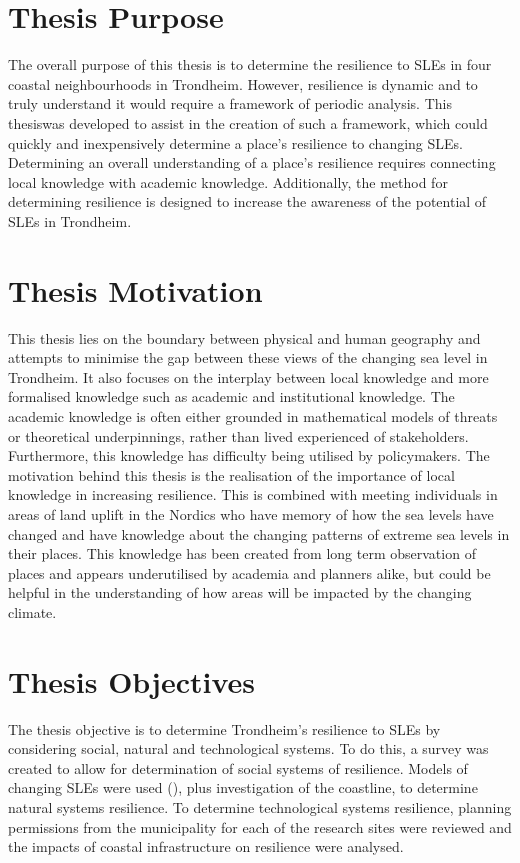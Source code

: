 \paragraph{}

\section{Thesis Purpose}
The overall purpose of this thesis is to determine the resilience to SLEs in four coastal neighbourhoods in Trondheim. However, resilience is dynamic and to truly understand it would require a framework of periodic analysis. This thesiswas developed to assist in the creation of such a framework, which could quickly and inexpensively determine a place's resilience to changing SLEs. Determining an overall understanding of a place's resilience requires connecting local knowledge with academic knowledge. Additionally, the method for determining resilience is designed to increase the awareness of the potential of SLEs in Trondheim. 

\section{Thesis Motivation}
 This thesis lies on the boundary between physical and human geography and attempts to minimise the gap between these views of the changing sea level in Trondheim. It also focuses on the interplay between local knowledge and more formalised knowledge such as academic and institutional knowledge. The academic knowledge is often either grounded in mathematical models of threats or theoretical underpinnings, rather than lived experienced of stakeholders. Furthermore, this knowledge has difficulty being utilised by policymakers. The motivation behind this thesis is the realisation of the importance of local knowledge in increasing resilience. This is combined with meeting individuals in areas of land uplift in the Nordics who have memory of how the sea levels have changed and have knowledge about the changing patterns of extreme sea levels in their places. This knowledge has been created from long term observation of places and appears underutilised by academia and planners alike, but could be helpful in the understanding of how areas will be impacted by the changing climate. 



\section{Thesis Objectives}
The thesis objective is to determine Trondheim's resilience to SLEs by considering social, natural and technological systems. To do this, a survey was created to allow for determination of social systems of resilience.  Models of changing SLEs were used (\cite{kartverket_se_2020}), plus investigation of the coastline, to determine natural systems resilience. To determine technological systems resilience, planning permissions from the municipality for each of the research sites were reviewed and the impacts of coastal infrastructure on resilience were analysed.

